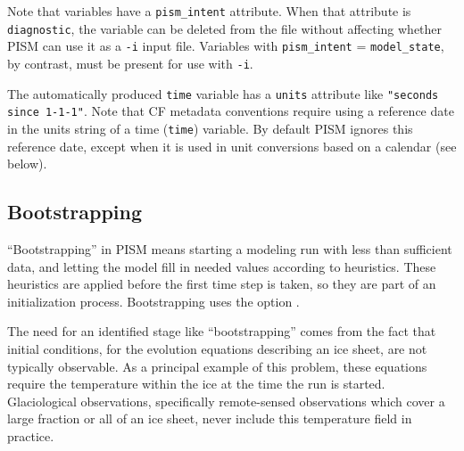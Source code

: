 Note that variables have a \texttt{pism_intent} attribute.  When that attribute is \texttt{diagnostic}, the variable can be deleted from the file without affecting whether PISM can use it as a \texttt{-i} input file.  Variables with \texttt{pism_intent} = \texttt{model_state}, by contrast, must be present for use with \texttt{-i}.

The automatically produced \texttt{time} variable has a \texttt{units} attribute like \texttt{"seconds since 1-1-1"}.  Note that CF metadata conventions require using a reference date in the units string of a time (\texttt{time}) variable. By default PISM ignores this reference date, except when it is used in unit conversions based on a calendar (see below).


\subsection{Bootstrapping}
\label{sec:bootstrapping}

``Bootstrapping'' in PISM means starting a modeling run with less than sufficient data, and letting the model fill in needed values according to heuristics.  These heuristics are applied before the first time step is taken, so they are part of an initialization process.  Bootstrapping uses the option .

The need for an identified stage like ``bootstrapping'' comes from the fact that initial conditions, for the evolution equations describing an ice sheet, are not typically observable.  As a principal example of this problem, these equations require the temperature within the ice at the time the run is started.  Glaciological observations, specifically remote-sensed observations which cover a large fraction or all of an ice sheet, never include this temperature field in practice.

